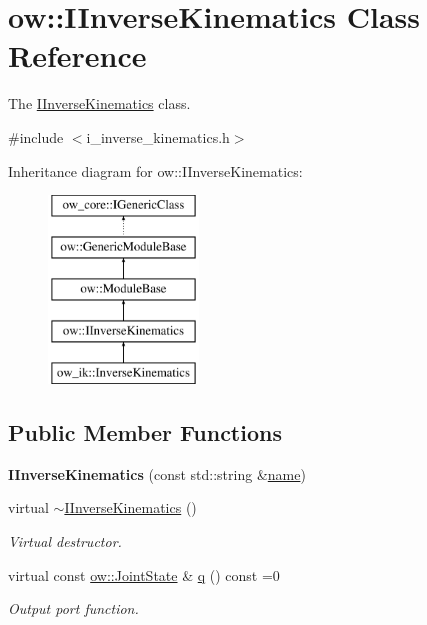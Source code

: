 \hypertarget{classow_1_1IInverseKinematics}{}\section{ow\+:\+:I\+Inverse\+Kinematics Class Reference}
\label{classow_1_1IInverseKinematics}


The \hyperlink{classow_1_1IInverseKinematics}{I\+Inverse\+Kinematics} class.  




{\ttfamily \#include $<$i\+\_\+inverse\+\_\+kinematics.\+h$>$}

Inheritance diagram for ow\+:\+:I\+Inverse\+Kinematics\+:\begin{figure}[H]
\begin{center}
\leavevmode
\includegraphics[height=5.000000cm]{d2/d98/classow_1_1IInverseKinematics}
\end{center}
\end{figure}
\subsection*{Public Member Functions}
\begin{DoxyCompactItemize}
\item 
{\bfseries I\+Inverse\+Kinematics} (const std\+::string \&\hyperlink{classow_1_1GenericModuleBase_a4b712883728cdbab7779e27f9a23689c}{name})\hypertarget{classow_1_1IInverseKinematics_a76efcd65c78a612a987d1ff2040e63df}{}\label{classow_1_1IInverseKinematics_a76efcd65c78a612a987d1ff2040e63df}

\item 
virtual \hyperlink{classow_1_1IInverseKinematics_a5896157240ab3d21612c5d7157632e97}{$\sim$\+I\+Inverse\+Kinematics} ()\hypertarget{classow_1_1IInverseKinematics_a5896157240ab3d21612c5d7157632e97}{}\label{classow_1_1IInverseKinematics_a5896157240ab3d21612c5d7157632e97}

\begin{DoxyCompactList}\small\item\em Virtual destructor. \end{DoxyCompactList}\item 
virtual const \hyperlink{classow__core_1_1JointState}{ow\+::\+Joint\+State} \& \hyperlink{classow_1_1IInverseKinematics_ac13eacbbae6e3b5252eef7305689cce1}{q} () const =0
\begin{DoxyCompactList}\small\item\em Output port function. \end{DoxyCompactList}\end{DoxyCompactItemize}
